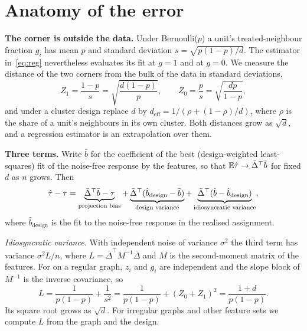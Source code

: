 \section{Anatomy of the error}\label{sec:anatomy}
\textbf{The corner is outside the data.}
Under Bernoulli($p$) a unit's treated-neighbour fraction $g_i$ has mean $p$ and standard deviation $s=\sqrt{p(1-p)/d}$. The estimator in~\eqref{eq:reg} nevertheless evaluates its fit at $g=1$ and at $g=0$.
We measure the distance of the two corners from the bulk of the data in standard deviations,
\begin{equation}
Z_1=\frac{1-p}{s}=\sqrt{\frac{d(1-p)}{p}},\qquad Z_0=\frac{p}{s}=\sqrt{\frac{dp}{1-p}},\label{eq:z}
\end{equation}
and under a cluster design replace $d$ by $d_{\mathrm{eff}}=1/(\rho+(1-\rho)/d)$, where $\rho$ is the share of a unit's neighbours in its own cluster.
Both distances grow as $\sqrt d$, and a regression estimator is an extrapolation over them.

\textbf{Three terms.}
Write $\bar b$ for the coefficient of the best (design-weighted least-squares) fit of the noise-free response by the features, so that $\mathbb{E}\hat\tau\to\bar\Delta^{\top}\bar b$ for fixed $d$ as $n$ grows. Then
\begin{equation}
\hat\tau-\tau=\underbrace{\bar\Delta^{\top}\bar b-\tau}_{\text{projection bias}}+\underbrace{\bar\Delta^{\top}(\hat b_{\text{design}}-\bar b)}_{\text{design variance}}+\underbrace{\bar\Delta^{\top}(\hat b-\hat b_{\text{design}})}_{\text{idiosyncratic variance}},\label{eq:decomp}
\end{equation}
where $\hat b_{\text{design}}$ is the fit to the noise-free response in the realised assignment.

\emph{Idiosyncratic variance.} With independent noise of variance $\sigma^2$ the third term has variance $\sigma^2L/n$, where $L=\bar\Delta^{\top}M^{-1}\bar\Delta$ and $M$ is the second-moment matrix of the features.
For  on a regular graph, $z_i$ and $g_i$ are independent and the slope block of $M^{-1}$ is the inverse covariance, so
\begin{equation}
L=\frac{1}{p(1-p)}+\frac{1}{s^2}=\frac1{p(1-p)}+(Z_0+Z_1)^2=\frac{1+d}{p(1-p)}.\label{eq:leverage}
\end{equation}
Its square root grows as $\sqrt d$. For irregular graphs and other feature sets we compute $L$ from the graph and the design.

